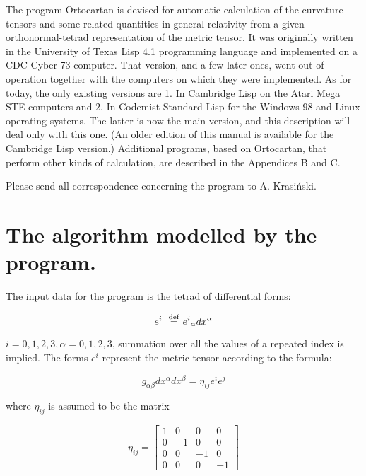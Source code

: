 The program Ortocartan is devised for automatic  calculation of the curvature
tensors and some related quantities in general relativity from a  given
orthonormal-tetrad  representation of the metric tensor. It was originally
written
     in the University of Texas Lisp 4.1 programming language and
     implemented on a CDC Cyber 73 computer. That version, and  a
few later ones, went out of operation together with the computers on which they
were implemented.  As  for  today,  the only existing versions are 1. In
Cambridge  Lisp on the Atari Mega STE  computers and 2. In Codemist Standard
Lisp for the Windows 98 and Linux operating systems. The latter is now the main
version, and this description will deal only with this one. (An older edition
of this manual is available for the Cambridge Lisp version.) Additional
programs, based on Ortocartan, that perform other kinds of calculation, are
described in the Appendices B and C.

Please send all correspondence concerning  the  program
     to A. Krasi\'nski.

\section{The algorithm modelled by the program.}

The input data for the program is the tetrad of differential forms:

\begin{equation}
e^i \ \ {\stackrel {{\rm def}} =} \ {e^i}_{\alpha}dx^{\alpha}
\end{equation}

\noindent $i = 0, 1, 2, 3, \alpha = 0, 1, 2, 3$, summation over all the values
of a repeated index is implied. The forms $e^i$ represent the  metric tensor
according to the formula:

\begin{equation}
g_{\alpha \beta} dx^{\alpha} dx^{\beta} = \eta_{ij}e^i e^j
\end{equation}

\noindent where $\eta_{ij}$ is assumed to be the matrix

\begin{equation}
\eta_{ij} = \left[ \begin{array}{rrrr}
  1 & 0 & 0 & 0 \\
  0 & -1 & 0 & 0 \\
  0 & 0 & -1 & 0 \\
  0 & 0 & 0 & -1
\end{array} \right]
\end{equation}

